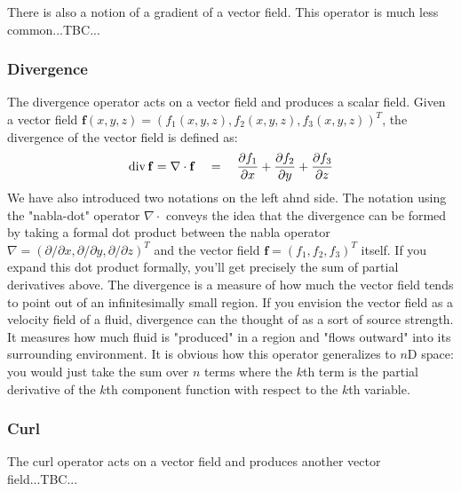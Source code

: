 
\medskip
There is also a notion of a gradient of a vector field. This operator is much less common...TBC...



\subsubsection{Divergence}
The divergence operator acts on a vector field and produces a scalar field. Given a vector field $\mathbf{f}(x,y,z) = (f_1(x,y,z), f_2(x,y,z), f_3(x,y,z))^T$, the divergence of the vector field is defined as:
\begin{equation}
 \operatorname{div} \mathbf{f} = \nabla \cdot \mathbf{f}  \quad = \quad
 \frac{\partial f_1}{\partial x} + 
 \frac{\partial f_2}{\partial y} + 
 \frac{\partial f_3}{\partial z}
\end{equation}
We have also introduced two notations on the left ahnd side. The notation using the "nabla-dot" operator $\nabla \cdot$ conveys the idea that the divergence can be formed by taking a formal dot product between the nabla operator $\nabla = (\partial / \partial x, \partial / \partial y, \partial / \partial z)^T$ and the vector field $\mathbf{f} = (f_1, f_2, f_3)^T$ itself. If you expand this dot product formally, you'll get precisely the sum of partial derivatives above. The divergence is a measure of how much the vector field tends to point out of an infinitesimally small region. If you envision the vector field as a velocity field of a fluid, divergence can the thought of as a sort of source strength. It measures how much fluid is "produced" in a region and "flows outward" into its surrounding environment. It is obvious how this operator generalizes to $n$D space: you would just take the sum over $n$ terms where the $k$th term is the partial derivative of the $k$th component function with respect to the $k$th variable.

\subsubsection{Curl}
The curl operator acts on a vector field and produces another vector field...TBC...


